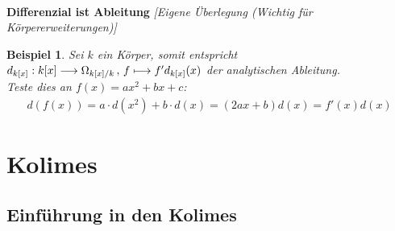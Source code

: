 \documentclass[10pt,a4paper]{report}
\newcommand{\comment}[1]{}
\newcounter{Aussage}[chapter]
\newtheorem{bsp}[Aussage]{Beispiel}
\newcommand{\function}[5]{\nolinebreak{#1:#2 \longrightarrow #3 \, , \, #4 \longmapsto #5}}
\newcommand{\divR}[2]{\Omega_{#1/#2}}
\newcommand{\divf}[1]{d_{#1}}
\begin{document}
\ \\
\textbf{Differenzial ist Ableitung} \textit{[Eigene Überlegung (Wichtig für Körpererweiterungen)]}
\begin{bsp}\label{Differenzial ist Ableitung}
Sei $k$ ein Körper, somit entspricht $\function{\divf{k[x]}}{k[x]}{\divR{k[x]}{k}}{f}{f'\divf{k[x]}(x)}$ der analytischen Ableitung.\\
Teste dies an $f(x)=ax^2 + bx +c$:
\begin{gather*}
d(f(x)) = a \cdot d(x^2) + b \cdot d(x) = (2ax + b) d(x) = f'(x) d(x) 
\end{gather*}
\comment{lässt sich induktiv für Monome leicht zeigen}
\end{bsp}


\chapter{Kolimes}
\section{Einführung in den Kolimes}
\end{document}
